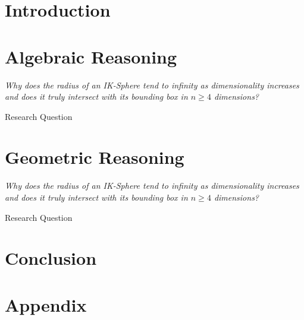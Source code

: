 \documentclass[a4paper, 12pt]{report}
\theoremstyle{definition}
\begin{document}
    
    
    
    \doublespacing
    
    
    \chapter{Introduction}
    
    
    \chapter{Algebraic Reasoning}
    \epigraph{\textit{Why  does  the  radius  of  an  IK-Sphere  tend  to  infinity  as  dimensionality increases and does it truly intersect with its bounding box in $n \geq 4$ dimensions?}}{Research Question}
    
    
    \chapter{Geometric Reasoning}
    \epigraph{\textit{Why  does  the  radius  of  an  IK-Sphere  tend  to  infinity  as  dimensionality increases and does it truly intersect with its bounding box in $n \geq 4$ dimensions?}}{Research Question}
    
    
    \chapter{Conclusion}
    
    
    \printbibliography
    
    \appendix
    \chapter{Appendix}
    
\end{document}
